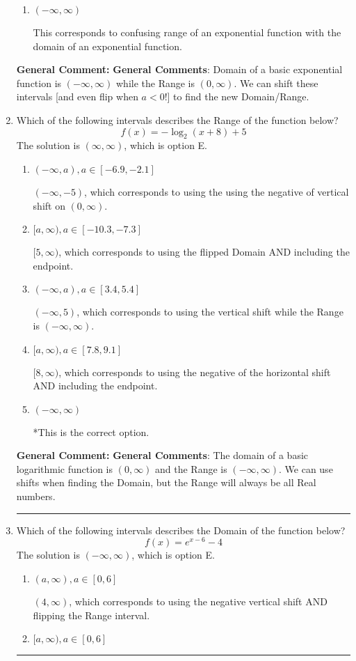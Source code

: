 \documentclass{extbook}[14pt]
\newcommand{\litem}[1]{\item #1

\rule{\textwidth}{0.4pt}}
\begin{document}
\begin{enumerate}
{\begin{enumerate}[label=\Alph*.]
* $(-\infty, -1)$, which is the correct option.
\item \( (-\infty, \infty) \)

This corresponds to confusing range of an exponential function with the domain of an exponential function.
\end{enumerate}

\textbf{General Comment:} \textbf{General Comments}: Domain of a basic exponential function is $(-\infty, \infty)$ while the Range is $(0, \infty)$. We can shift these intervals [and even flip when $a<0$!] to find the new Domain/Range.
}
\litem{
Which of the following intervals describes the Range of the function below?
\[ f(x) = -\log_2{(x+8)}+5 \]The solution is \( (\infty, \infty) \), which is option E.\begin{enumerate}[label=\Alph*.]
\item \( (-\infty, a), a \in [-6.9, -2.1] \)

$(-\infty, -5)$, which corresponds to using the using the negative of vertical shift on $(0, \infty)$.
\item \( [a, \infty), a \in [-10.3, -7.3] \)

$[5, \infty)$, which corresponds to using the flipped Domain AND including the endpoint.
\item \( (-\infty, a), a \in [3.4, 5.4] \)

$(-\infty, 5)$, which corresponds to using the vertical shift while the Range is $(-\infty, \infty)$.
\item \( [a, \infty), a \in [7.8, 9.1] \)

$[8, \infty)$, which corresponds to using the negative of the horizontal shift AND including the endpoint.
\item \( (-\infty, \infty) \)

*This is the correct option.
\end{enumerate}

\textbf{General Comment:} \textbf{General Comments}: The domain of a basic logarithmic function is $(0, \infty)$ and the Range is $(-\infty, \infty)$. We can use shifts when finding the Domain, but the Range will always be all Real numbers.
}
\litem{
Which of the following intervals describes the Domain of the function below?
\[ f(x) = e^{x-6}-4 \]The solution is \( (-\infty, \infty) \), which is option E.\begin{enumerate}[label=\Alph*.]
\item \( (a, \infty), a \in [0, 6] \)

$(4, \infty)$, which corresponds to using the negative vertical shift AND flipping the Range interval.
\item \( [a, \infty), a \in [0, 6] \)


\end{enumerate}}
\end{enumerate}
\end{document}

